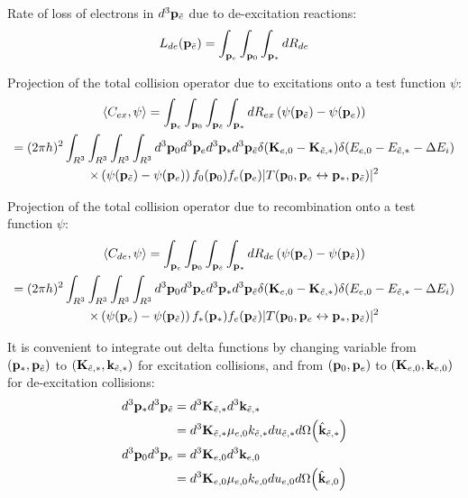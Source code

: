 \documentclass{article}[draft]
\begin{document}
Rate of loss of electrons in $d^3 \mathbf{p}_{\tilde{e}}$ due to de-excitation reactions:
\begin{align*}
L_{de}\of{\vect{p}_\te} = \int_{\vect{p}_e} \int_{\vect{p}_0} \int_{\vect{p}_*} d R_{de}
\end{align*}


Projection of the total collision operator due to excitations onto a test function $\psi$:
\begin{multline*}
\left< C_{ex}, \psi \right> = 
\int_{\vect{p}_e} \int_{\vect{p}_0} 
\int_{\vect{p}_\te} \int_{\vect{p}_*}
d R_{ex} \left( \psi\of{\vect{p}_\te}  
- \psi\of{\vect{p}_e} \right)
\\
= (2\pi h)^2 
\int_{R^3} \int_{R^3} 
\int_{R^3} \int_{R^3}
d^3 \vect{p}_0 d^3 \vect{p}_e
d^3 \vect{p}_* d^3 \vect{p}_\te  
\delta\of{\vect{K}_{e,0} - \vect{K}_{\te,*}} 
\delta\of{E_{e,0} - E_{\te,*} - \Delta E_i}
\\
\times
\left( \psi\of{\vect{p}_\te} - \psi\of{\vect{p}_e} \right) 
f_0\of{\vect{p}_0} f_e\of{\vect{p}_e} 
| T\of{\vect{p}_0, \vect{p}_e \leftrightarrow \vect{p}_*, \vect{p}_\te} |^2
\end{multline*}

Projection of the total collision operator due to recombination onto a test function $\psi$:
\begin{multline*}
\left< C_{de}, \psi \right> = 
\int_{\vect{p}_e} \int_{\vect{p}_0} 
\int_{\vect{p}_\te} \int_{\vect{p}_*}
d R_{de} \left( \psi\of{\vect{p}_e} - \psi\of{\vect{p}_\te} \right)
\\
= (2\pi h)^2 
\int_{R^3} \int_{R^3} 
\int_{R^3} \int_{R^3}
d^3 \vect{p}_0 d^3 \vect{p}_e
d^3 \vect{p}_* d^3 \vect{p}_\te  
\delta\of{\vect{K}_{e,0} - \vect{K}_{\te,*}} 
\delta\of{E_{e,0} - E_{\te,*} - \Delta E_i}
\\
\times
\left( \psi\of{\vect{p}_e} - \psi\of{\vect{p}_\te} \right) 
f_*\of{\vect{p}_*} f_e\of{\vect{p}_\te} 
| T\of{\vect{p}_0, \vect{p}_e \leftrightarrow \vect{p}_*, \vect{p}_\te} |^2
\end{multline*}

It is convenient to integrate out delta functions by changing variable from $(\mathbf{p}_*, \mathbf{p}_{\tilde{e}})$ to $(\mathbf{K}_{{\tilde{e}},*}, \mathbf{k}_{{\tilde{e}},*})$ for excitation collisions, and from $(\mathbf{p}_0, \mathbf{p}_e)$ to $(\mathbf{K}_{e,0}, \mathbf{k}_{e,0})$ for de-excitation collisions: 
\begin{align*}
d^3 \vect{p}_* d^3 \vect{p}_\te 
&= d^3 \vect{K}_{\te,*} d^3 \vect{k}_{\te,*}
\\
&= d^3 \vect{K}_{\te,*} \mu_{e,0} k_{\te,*} d u_{\te,*} d \Omega\of{\hat{\vect{k}}_{\te,*}}
\\
d^3 \vect{p}_0 d^3 \vect{p}_e 
&= d^3 \vect{K}_{e,0} d^3 \vect{k}_{e,0}
\\
&= d^3 \vect{K}_{e,0} \mu_{e,0} k_{e,0} d u_{e,0} d \Omega\of{\hat{\vect{k}}_{e,0}}
\end{align*}
\end{document}
